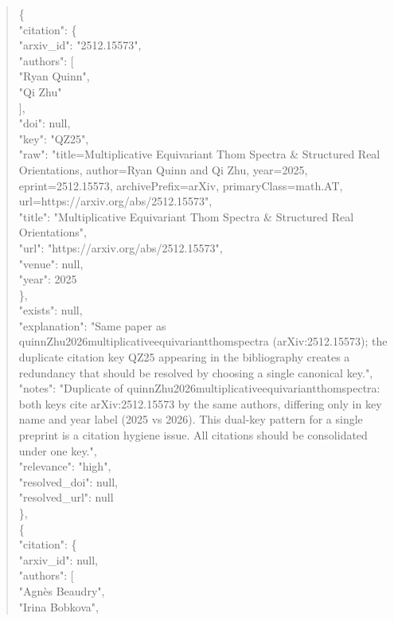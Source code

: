 \documentclass[11pt]{article}
\begin{document}
\begin{quote}
    \{\\
      "citation": \{\\
        "arxiv\_id": "2512.15573",\\
        "authors": [\\
          "Ryan Quinn",\\
          "Qi Zhu"\\
        ],\\
        "doi": null,\\
        "key": "QZ25",\\
        "raw": "title=Multiplicative Equivariant Thom Spectra \& Structured Real Orientations, author=Ryan Quinn and Qi Zhu, year=2025, eprint=2512.15573, archivePrefix=arXiv, primaryClass=math.AT, url=https://arxiv.org/abs/2512.15573",\\
        "title": "Multiplicative Equivariant Thom Spectra \& Structured Real Orientations",\\
        "url": "https://arxiv.org/abs/2512.15573",\\
        "venue": null,\\
        "year": 2025\\
      \},\\
      "exists": null,\\
      "explanation": "Same paper as quinnZhu2026multiplicativeequivariantthomspectra (arXiv:2512.15573); the duplicate citation key QZ25 appearing in the bibliography creates a redundancy that should be resolved by choosing a single canonical key.",\\
      "notes": "Duplicate of quinnZhu2026multiplicativeequivariantthomspectra: both keys cite arXiv:2512.15573 by the same authors, differing only in key name and year label (2025 vs 2026). This dual-key pattern for a single preprint is a citation hygiene issue. All citations should be consolidated under one key.",\\
      "relevance": "high",\\
      "resolved\_doi": null,\\
      "resolved\_url": null\\
    \},\\
    \{\\
      "citation": \{\\
        "arxiv\_id": null,\\
        "authors": [\\
          "Agnès Beaudry",\\
          "Irina Bobkova",\\

\end{quote}
\end{document}
